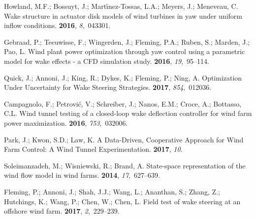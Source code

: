 \documentclass[energies,article,submit,moreauthors,latex,10pt,a4paper]{mdpi}
\begin{document}
\begin{thebibliography}{999}
	Howland, M.F.; Bossuyt, J.; Mart{\'\i}nez-Tossas, L.A.; Meyers, J.; Meneveau,
	C.
	\newblock Wake structure in actuator disk models of wind turbines in yaw under
	uniform inflow conditions.
	 {\bf 2016}, {\em
		8},~043301.
	
	Gebraad, P.; Teeuwisse, F.; Wingerden, J.; Fleming, P.A.; Ruben, S.; Marden,
	J.; Pao, L.
	\newblock Wind plant power optimization through yaw control using a parametric
	model for wake effects - a CFD simulation study.
	 {\bf 2016}, {\em 19},~95--114.
	
	Quick, J.; Annoni, J.; King, R.; Dykes, K.; Fleming, P.; Ning, A.
	\newblock Optimization Under Uncertainty for Wake Steering Strategies.
	 {\bf 2017}, {\em
		854},~012036.
	
	Campagnolo, F.; Petrovi{\'c}, V.; Schreiber, J.; Nanos, E.M.; Croce, A.;
	Bottasso, C.L.
	\newblock Wind tunnel testing of a closed-loop wake deflection controller for
	wind farm power maximization.
	 {\bf 2016}, {\em
		753},~032006.
	
	Park, J.; Kwon, S.D.; Law, K.
	\newblock A Data-Driven, Cooperative Approach for Wind Farm Control: A Wind
	Tunnel Experimentation.
	 {\bf 2017}, {\em 10}.
	
	Soleimanzadeh, M.; Wisniewski, R.; Brand, A.
	\newblock State-space representation of the wind flow model in wind farms.
	 {\bf 2014}, {\em 17},~627--639.
	
	Fleming, P.; Annoni, J.; Shah, J.J.; Wang, L.; Ananthan, S.; Zhang, Z.;
	Hutchings, K.; Wang, P.; Chen, W.; Chen, L.
	\newblock Field test of wake steering at an offshore wind farm.
	 {\bf 2017}, {\em 2},~229--239.
	

\end{thebibliography}
\end{document}
